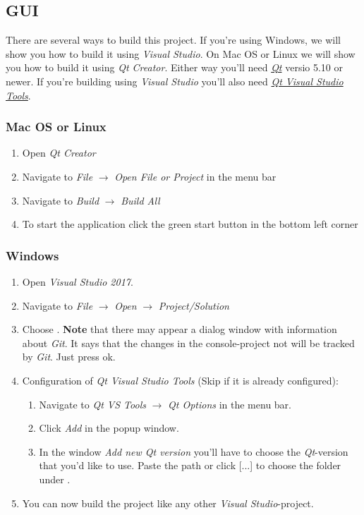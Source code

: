 \subsection{GUI} \label{GUI}
There are several ways to build this project. If you're using Windows, we will show you how to build it using \textit{Visual Studio}. On Mac OS or Linux we will show you how to build it using \textit{Qt Creator}. Either way you'll need \href{https://www.qt.io/download}{\textit{Qt}} versio 5.10 or newer. If you're building using \textit{Visual Studio} you'll also need \href{https://marketplace.visualstudio.com/items?itemName=TheQtCompany.QtVisualStudioTools-19123}{\textit{Qt Visual Studio Tools}}.

\subsubsection{Mac OS or Linux}
\begin{enumerate}
    \item Open \textit{Qt Creator}
    \item Navigate to \textit{File} \(\rightarrow\) \textit{Open File or Project} in the menu bar
    \item Navigate to \textit{Build} \(\rightarrow\) \textit{Build All}
    \item To start the application click the green start button in the bottom left corner
\end{enumerate}
\subsubsection{Windows}
\begin{enumerate}
    \item Open \textit{Visual Studio 2017}.
    \item Navigate to \textit{File} \(\rightarrow\) \textit{Open} \(\rightarrow\) \textit{Project/Solution}
    \item Choose .
    \textbf{Note} that there may appear a dialog window with information about \textit{Git}. It says that the changes in the console-project not will be tracked by \textit{Git}. Just press ok.
    \item Configuration of \textit{Qt Visual Studio Tools} (Skip if it is already configured):
        \begin{enumerate}
            \item Navigate to \textit{Qt VS Tools} \(\rightarrow\) \textit{Qt Options} in the menu bar. 
            \item Click \textit{Add} in the popup window. 
            \item In the window \textit{Add new Qt version} you'll have to choose the \textit{Qt}-version that you'd like to use. Paste the path or click [...] to choose the folder  under .
        \end{enumerate}
    \item You can now build the project like any other \textit{Visual Studio}-project.
\end{enumerate}